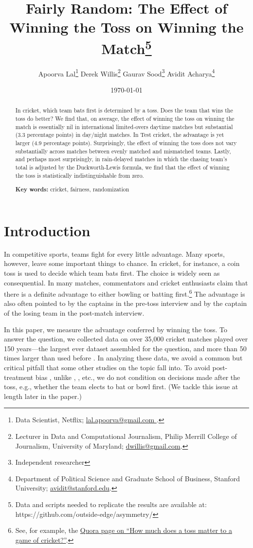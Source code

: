 \documentclass[12pt, letterpaper]{article}
\title{Fairly Random: The Effect of Winning the Toss on Winning the Match\thanks{Data and scripts needed to replicate the results are available at: https://github.com/outside-edge/asymmetry/}}
\author{
Apoorva Lal\thanks{Data Scientist, Netflix;  \href{mailto:lal.apoorva@gmail.com}{lal.apoorva@gmail.com }.} \;\;
Derek Willis\thanks{Lecturer in Data and Computational Journalism, Philip Merrill College of Journalism, University of Maryland;  \href{mailto:dwillis@gmail.com}{dwillis@gmail.com}.}  \;\;
Gaurav Sood\thanks{Independent researcher}\;\;
Avidit Acharya\thanks{Department of Political Science and Graduate School of Business, Stanford University; \href{mailto:avidit@stanford.edu}{avidit@stanford.edu}.}
}
\date{\today}
\begin{document}
\maketitle
\doublespacing

\begin{abstract}

In cricket, which team bats first is determined by a toss. Does the team that wins the toss do better? We find that, on average, the effect of winning the toss on winning the match is essentially nil in international limited-overs daytime matches but substantial (3.3 percentage points) in day/night matches. In Test cricket, the advantage is yet larger (4.9 percentage points). Surprisingly, the effect of winning the toss does not vary substantially across matches between evenly matched and mismatched teams. Lastly, and perhaps most surprisingly, in rain-delayed matches in which the chasing team's total is adjusted by the Duckworth-Lewis formula, we find that the effect of winning the toss is statistically indistinguishable from zero.

\smallskip

\textbf{Key words:} cricket, fairness, randomization

\end{abstract}

\section{Introduction}

In competitive sports, teams fight for every little advantage. Many sports, however, leave some important things to chance. In cricket, for instance, a coin toss is used to decide which team bats first. The choice is widely seen as consequential. In many matches, commentators and cricket enthusiasts claim that there is a definite advantage to either bowling or batting first.\footnote{See, for example, the \href{https://www.quora.com/How-much-does-a-toss-matter-to-a-game-of-cricket}{Quora page on ``How much does a toss matter to a game of cricket?''}.} The advantage is also often pointed to by the captains in the pre-toss interview and by the captain of the losing team in the post-match interview.

In this paper, we measure the advantage conferred by winning the toss. To answer the question, we collected data on over 35,000 cricket matches played over 150 years---the largest ever dataset assembled for the question, and more than 50 times larger than used before \citep[see,][]{dawson2009bat, de1998winning}. In analyzing these data, we avoid a common but critical pitfall that some other studies on the topic fall into. To avoid post-treatment bias \citep[see][]{acharya2015}, unlike \citet{dawson2009bat}, \citet{Saad2015}, etc., we do not condition on decisions made after the toss, e.g., whether the team elects to bat or bowl first. (We tackle this issue at length later in the paper.)
\end{document}

